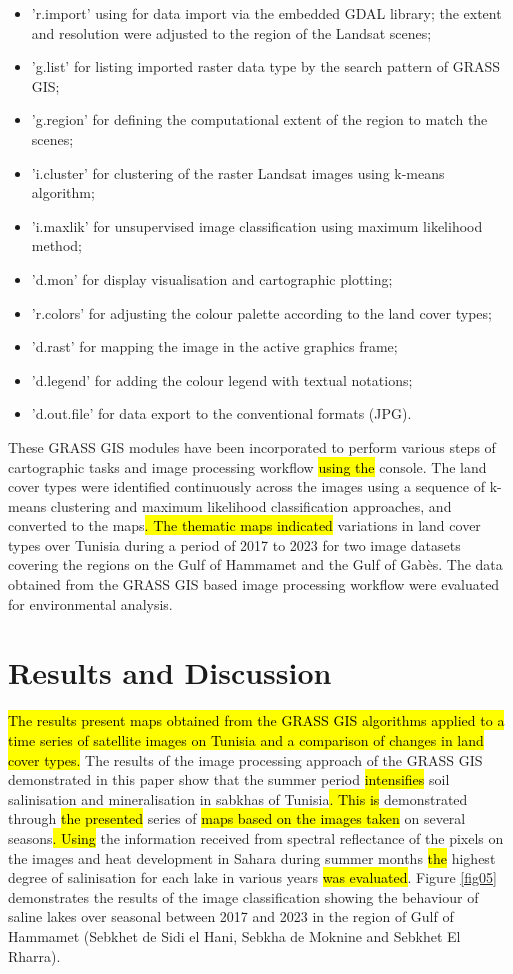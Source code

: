 \documentclass[land,article,submit,pdftex,moreauthors]{Definitions/mdpi}
\begin{document}
\begin{itemize}
	\item 'r.import' using for data import via the embedded GDAL library; the extent and resolution were adjusted to the region of the Landsat scenes;
	\item 'g.list' for listing imported raster data type by the search pattern of GRASS GIS; 
	\item 'g.region' for defining the computational extent of the region to match the scenes; 
	\item 'i.cluster' for clustering of the raster Landsat images using k-means algorithm; 
	\item 'i.maxlik' for unsupervised image classification using maximum likelihood method; 
	\item 'd.mon' for display visualisation and cartographic plotting; 
	\item 'r.colors' for adjusting the colour palette according to the land cover types; 
	\item 'd.rast' for mapping the image in the active graphics frame; 
	\item 'd.legend' for adding the colour legend with textual notations; 
	\item 'd.out.file' for data export to the conventional formats (JPG). 
\end{itemize}

These GRASS GIS modules have been incorporated to perform various steps of cartographic tasks and image processing workflow \hl{using the} console. The land cover types were identified continuously across the images using a sequence of k-means clustering and maximum likelihood classification approaches, and converted to the maps\hl{. The thematic maps indicated }variations in land cover types over Tunisia during a period of 2017 to 2023 for two image datasets covering the regions on the Gulf of Hammamet and the Gulf of Gabès. The data obtained from the GRASS GIS based image processing workflow were evaluated for environmental analysis.

\section{Results and Discussion}

\hl{The results present maps obtained from the GRASS GIS algorithms applied to a time series of satellite images on Tunisia and a comparison of changes in land cover types. }The results of the image processing approach of the GRASS GIS demonstrated in this paper show that the summer period \hl{intensifies} soil salinisation and mineralisation in sabkhas of Tunisia\hl{. This is } demonstrated through \hl{the presented }series of \hl{maps based on the images taken} on several seasons\hl{. Using} the information received from spectral reflectance of the pixels on the images and heat development in Sahara during summer months \hl{the} highest degree of salinisation for each lake in various years \hl{was evaluated}. Figure \ref{fig05} demonstrates the results of the image classification showing the behaviour of saline lakes over seasonal between 2017 and 2023 in the region of Gulf of Hammamet (Sebkhet de Sidi el Hani, Sebkha de Moknine and Sebkhet El Rharra). 
\end{document}
